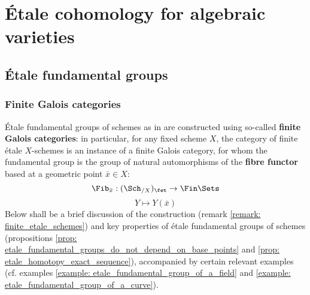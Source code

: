 \section{\'Etale cohomology for algebraic varieties}
    \subsection{\'Etale fundamental groups}
        \subsubsection{Finite Galois categories}
            \'Etale fundamental groups of schemes as in \cite[Expos\'e V]{SGA1} are constructed using so-called \textbf{finite Galois categories}: in particular, for any fixed scheme $X$, the category of finite \'etale $X$-schemes is an instance of a finite Galois category, for whom the fundamental group is the group of natural automorphisms of the \textbf{fibre functor} based at a geometric point $\bar{x} \in X$:
                $$\Fib_{\bar{x}}: (\Sch_{/X})_{\fet} \to \Fin\Sets$$
                $$Y \mapsto Y(\bar{x})$$
            Below shall be a brief discussion of the construction (remark \ref{remark: finite_etale_schemes}) and key properties of \'etale fundamental groups of schemes (propositions \ref{prop: etale_fundamental_groups_do_not_depend_on_base_points} and \ref{prop: etale_homotopy_exact_sequence}), accompanied by certain relevant examples (cf. examples \ref{example: etale_fundamental_group_of_a_field} and \ref{example: etale_fundamental_group_of_a_curve}). 
            

